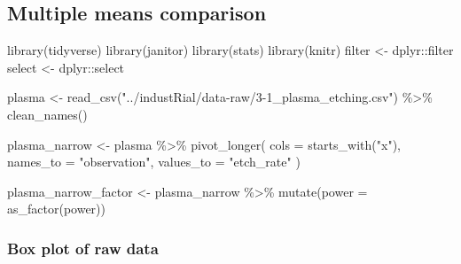 \documentclass[
]{book}
\newenvironment{Shaded}{\begin{snugshade}}{\end{snugshade}}
\newcommand{\AttributeTok}[1]{\textcolor[rgb]{0.77,0.63,0.00}{#1}}
\newcommand{\FunctionTok}[1]{\textcolor[rgb]{0.00,0.00,0.00}{#1}}
\newcommand{\NormalTok}[1]{#1}
\newcommand{\OtherTok}[1]{\textcolor[rgb]{0.56,0.35,0.01}{#1}}
\newcommand{\SpecialCharTok}[1]{\textcolor[rgb]{0.00,0.00,0.00}{#1}}
\newcommand{\StringTok}[1]{\textcolor[rgb]{0.31,0.60,0.02}{#1}}
\begin{document}
\hypertarget{multiple-means-comparison}{%
\subsection{Multiple means comparison}\label{multiple-means-comparison}}

\begin{Shaded}
\begin{Highlighting}[]
\FunctionTok{library}\NormalTok{(tidyverse)}
\FunctionTok{library}\NormalTok{(janitor)}
\FunctionTok{library}\NormalTok{(stats)}
\FunctionTok{library}\NormalTok{(knitr)}
\NormalTok{filter }\OtherTok{\textless{}{-}}\NormalTok{ dplyr}\SpecialCharTok{::}\NormalTok{filter}
\NormalTok{select }\OtherTok{\textless{}{-}}\NormalTok{ dplyr}\SpecialCharTok{::}\NormalTok{select}
\end{Highlighting}
\end{Shaded}

\begin{Shaded}
\begin{Highlighting}[]
\NormalTok{plasma }\OtherTok{\textless{}{-}} \FunctionTok{read\_csv}\NormalTok{(}\StringTok{"../industRial/data{-}raw/3{-}1\_plasma\_etching.csv"}\NormalTok{) }\SpecialCharTok{\%\textgreater{}\%}
  \FunctionTok{clean\_names}\NormalTok{()}

\NormalTok{plasma\_narrow }\OtherTok{\textless{}{-}}\NormalTok{ plasma }\SpecialCharTok{\%\textgreater{}\%}
  \FunctionTok{pivot\_longer}\NormalTok{(}
    \AttributeTok{cols =} \FunctionTok{starts\_with}\NormalTok{(}\StringTok{"x"}\NormalTok{),}
    \AttributeTok{names\_to =} \StringTok{"observation"}\NormalTok{,}
    \AttributeTok{values\_to =} \StringTok{"etch\_rate"}
\NormalTok{  )}
\end{Highlighting}
\end{Shaded}

\begin{Shaded}
\begin{Highlighting}[]
\NormalTok{plasma\_narrow\_factor }\OtherTok{\textless{}{-}}\NormalTok{ plasma\_narrow }\SpecialCharTok{\%\textgreater{}\%}
  \FunctionTok{mutate}\NormalTok{(}\AttributeTok{power =} \FunctionTok{as\_factor}\NormalTok{(power))}
\end{Highlighting}
\end{Shaded}

\hypertarget{box-plot-of-raw-data}{%
\subsubsection{Box plot of raw data}\label{box-plot-of-raw-data}}
\end{document}
